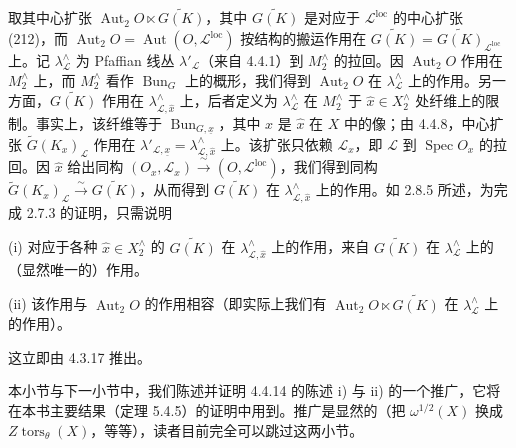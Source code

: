 取其中心扩张 $\operatorname{Aut}_{2}O\ltimes\widetilde{G(K)}$，其中 $\widetilde{G(K)}$ 是对应于 $\mathcal{L}^{\mathrm{loc}}$ 的中心扩张 (212)，而 $\operatorname{Aut}_{2}O=\operatorname{Aut}(O,\mathcal{L}^{\mathrm{loc}})$ 按结构的搬运作用在 $\widetilde{G(K)}=\widetilde{G(K)}_{\mathcal{L}^{\mathrm{loc}}}$ 上。记 $\lambda_{\mathcal{L}}^{\wedge}$ 为 Pfaffian 线丛 $\lambda'_{\mathcal{L}}$（来自 4.4.1）到 $M_{2}^{\wedge}$ 的拉回。因 $\operatorname{Aut}_{2}O$ 作用在 $M_{2}^{\wedge}$ 上，而 $M_{2}^{\wedge}$ 看作 $\operatorname{Bun}_{G}$ 上的概形，我们得到 $\operatorname{Aut}_{2}O$ 在 $\lambda_{\mathcal{L}}^{\wedge}$ 上的作用。另一方面，$\widetilde{G(K)}$ 作用在 $\lambda_{\mathcal{L},\hat x}^{\wedge}$ 上，后者定义为 $\lambda_{\mathcal{L}}^{\wedge}$ 在 $M_{2}^{\wedge}$ 于 $\hat x\in X_{2}^{\wedge}$ 处纤维上的限制。事实上，该纤维等于 $\operatorname{Bun}_{G,\underline{x}}$，其中 $x$ 是 $\hat x$ 在 $X$ 中的像；由 4.4.8，中心扩张 $\tilde{G}(K_{x})_{\mathcal{L}}$ 作用在 $\lambda'_{\mathcal{L},\underline{x}}=\lambda_{\mathcal{L},\hat x}^{\wedge}$ 上。该扩张只依赖 $\mathcal{L}_{x}$，即 $\mathcal{L}$ 到 $\operatorname{Spec}O_{x}$ 的拉回。因 $\hat x$ 给出同构 $(O_{x},\mathcal{L}_{x})\xrightarrow{\ \sim\ }(O,\mathcal{L}^{\mathrm{loc}})$，我们得到同构 $\tilde{G}(K_{x})_{\mathcal{L}}\xrightarrow{\ \sim\ }\widetilde{G(K)}$，从而得到 $\widetilde{G(K)}$ 在 $\lambda_{\mathcal{L},\hat x}^{\wedge}$ 上的作用。如 2.8.5 所述，为完成 2.7.3 的证明，只需说明


(i) 对应于各种 $\hat x\in X_{2}^{\wedge}$ 的 $\widetilde{G(K)}$ 在 $\lambda_{\mathcal{L},\hat x}^{\wedge}$ 上的作用，来自 $\widetilde{G(K)}$ 在 $\lambda_{\mathcal{L}}^{\wedge}$ 上的（显然唯一的）作用。

(ii) 该作用与 $\operatorname{Aut}_{2}O$ 的作用相容（即实际上我们有 $\operatorname{Aut}_{2}O\ltimes\widetilde{G(K)}$ 在 $\lambda_{\mathcal{L}}^{\wedge}$ 上的作用）。

这立即由 4.3.17 推出。

 本小节与下一小节中，我们陈述并证明 4.4.14 的陈述 i) 与 ii) 的一个推广，它将在本书主要结果（定理 5.4.5）的证明中用到。推广是显然的（把 $\omega^{1/2}(X)$ 换成 $Z\operatorname{tors}_{\theta}(X)$，等等），读者目前完全可以跳过这两小节。

